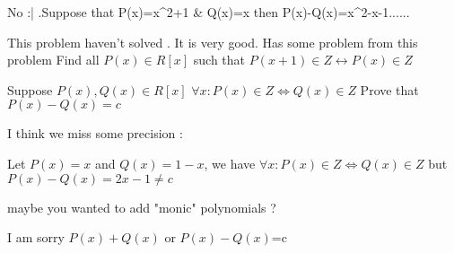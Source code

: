 \begin{solution}
	No :| .Suppose that P(x)=x^2+1 & Q(x)=x then P(x)-Q(x)=x^2-x-1......
\end{solution}



\begin{solution}
	This problem haven't solved .
It is very good.
Has some problem from this problem
Find all $ P(x)\in R[x]$ such that
$ P(x+1)\in Z\leftrightarrow P(x)\in Z$
\end{solution}



\begin{solution}
	\begin{tcolorbox}Suppose  $ P(x),Q(x)\in R[x]$
$ \forall x : P(x)\in Z\Leftrightarrow Q(x)\in Z$
Prove that $ P(x)-Q(x) = c$\end{tcolorbox}

I think we miss some precision :

Let $ P(x)=x$ and $ Q(x)=1-x$, we have $ \forall x : P(x)\in Z\Leftrightarrow Q(x)\in Z$ but $ P(x)-Q(x) = 2x-1\neq c$

maybe you wanted to add "monic" polynomials ?
\end{solution}



\begin{solution}
	I am sorry $ P(x)+Q(x)$ or $ P(x)-Q(x)$=c
\end{solution}



